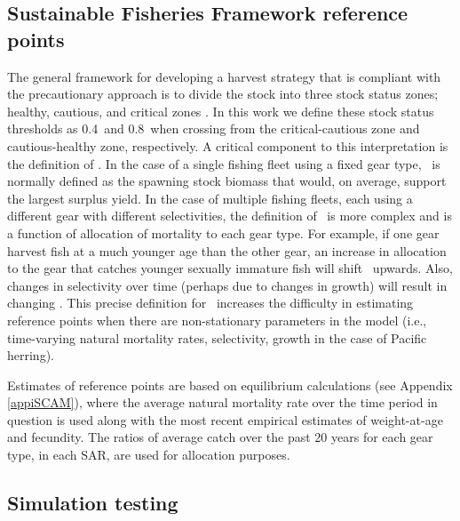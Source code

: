 	\subsection{Sustainable Fisheries Framework reference points}
	The general framework for developing a harvest strategy that is compliant with the precautionary approach is to divide the stock into three stock status zones; healthy, cautious, and critical zones \citep{dfo2006}.  In this work we define these stock status thresholds as 0.4\bmsy\ and 0.8\bmsy\ when crossing from the critical-cautious zone and cautious-healthy zone, respectively.  A critical component to this interpretation is the definition of \bmsy.  In the case of a single fishing fleet using a fixed gear type, \bmsy\ is normally defined as the spawning stock biomass that would, on average, support the largest surplus yield.  In the case of multiple fishing fleets, each using a different gear with different selectivities, the definition of \bmsy\ is more complex and is a function of allocation of mortality to each gear type.  For example, if one gear harvest fish at a much younger age than the other gear, an increase in allocation to the gear that catches younger sexually immature fish will shift \bmsy\ upwards. Also, changes in selectivity over time (perhaps due to changes in growth) will result in changing \bmsy.  This precise definition for \bmsy\ increases the difficulty in estimating reference points when there are non-stationary parameters in the model (i.e., time-varying natural mortality rates, selectivity, growth in the case of Pacific herring).
	
	Estimates of reference points are based on equilibrium calculations (see Appendix \ref{appiSCAM}), where the average natural mortality rate over the time period in question is used along with the most recent empirical estimates of weight-at-age and fecundity.  The ratios of average catch over the past 20 years for each gear type, in each SAR, are used for allocation purposes. 
	
	
	

	
	\subsection{Simulation testing}
	
